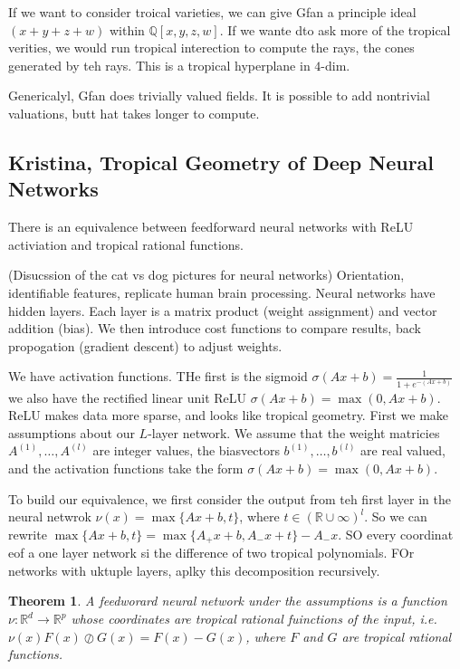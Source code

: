 \documentclass[11pt]{article}
\newtheorem{prototheorem}{Theorem}[section]
\newenvironment{theorem}
   {\begin{prototheorem}}
   {\end{prototheorem}}
\theoremstyle{definition}
\def\QQ{{\mathbb Q}}
\def\RR{{\mathbb R}}
\begin{document}
If we want to consider troical varieties, we can give Gfan a principle ideal $(x+y+z+w)$ within $\QQ[x,y,z,w]$. If we wante dto ask more of the tropical verities, we would run tropical interection to compute the rays, the cones generated by teh rays. This is a tropical hyperplane in $4$-dim.

Genericalyl, Gfan does trivially valued fields. It is possible to add nontrivial valuations, butt hat takes longer to compute.


\subsection{Kristina, Tropical Geometry of Deep Neural Networks}

There is an equivalence between feedforward neural networks with ReLU activiation and tropical rational functions.

(Disucssion of the cat vs dog pictures for neural networks) Orientation, identifiable features, replicate human brain processing. Neural networks have hidden layers. Each layer is a matrix product (weight assignment) and vector addition (bias). We then introduce cost functions to compare results, back propogation (gradient descent) to adjust weights.

We have activation functions. THe first is the sigmoid $\sigma(Ax+b)= \frac{1}{1+e^{-(Ax+b)}}$ we also have the rectified linear unit ReLU $\sigma(Ax+b)= \max(0,Ax+b)$. ReLU makes data more sparse, and looks like tropical geometry. First we make assumptions about our $L$-layer network. We assume that the weight matricies $A^(1), \dots, A^{(l)}$ are integer values, the biasvectors $b^{(1)}, \dots, b^{(l)}$ are real valued, and the activation functions take the form  $\sigma(Ax+b)= \max(0,Ax+b)$.


To build our equivalence, we first consider the output from teh first layer in the neural netwrok $\nu(x) = \max\{Ax+b,t\}$, where $t \in (\RR\cup \infty)^l$. So we can rewrite $\max\{Ax+b,t\} = \max\{A_+x+b, A_-x + t\} - A_-x$. SO every coordinat eof a one layer network si the difference of two tropical polynomials. FOr networks with uktuple layers, aplky this decomposition recursively.

\begin{theorem}
    A feedworard neural network under the assumptions is a function $\nu: \RR^d \rightarrow \RR^p$ whose coordinates are tropical rational fuinctions of the input, i.e. $\nu(x) F(x) \oslash G(x) = F(x) -G(x)$, where $F$ and $G$ are tropical rational functions.
\end{theorem}
\end{document}
